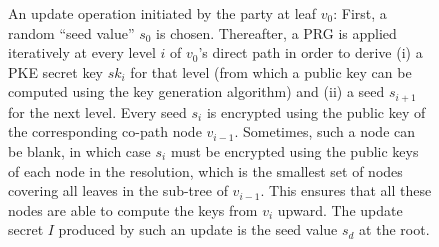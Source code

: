 \begin{figure}[ht!]
  \centering
  \caption[TreeKEM shared secret update.]{%
  \label{fig:CGKA-TreeKEM-Secrets}%
  An update operation initiated by the party at leaf \(v_0\): First, a random ``seed value'' \(s_0\) is chosen.
  Thereafter, a PRG is applied iteratively at every level \(i\) of \(v_0\)'s direct path in order to derive
  (i) a PKE secret key \(sk_i\) for that level (from which a public key can be computed using the key generation algorithm) and
  (ii) a seed \(s_{i+1}\) for the next level.
  Every seed \(s_i\) is encrypted using the public key of the corresponding co-path node \(v_{i-1}\).
  Sometimes, such a node can be blank, in which case \(s_i\) must be encrypted using the public keys of each node in the resolution, which is the smallest set of nodes covering all leaves in the sub-tree of \(v_{i-1}\).
  This ensures that all these nodes are able to compute the keys from \(v_i\) upward.
  The update secret \(I\) produced by such an update is the seed value \(s_d\) at the root.
  }%
  {}
\end{figure}

